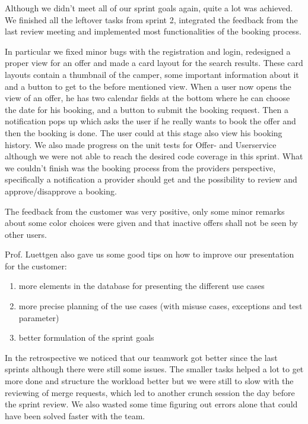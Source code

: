 Although we didn't meet all of our sprint goals again, quite a lot was achieved.
We finished all the leftover tasks from sprint 2, integrated the feedback from the last review meeting and implemented most functionalities of the booking process.

In particular we fixed minor bugs with the registration and login, redesigned a proper view for an offer and made a card layout for the search results.
These card layouts contain a thumbnail of the camper, some important information about it and a button to get to the before mentioned view.
When a user now opens the view of an offer, he has two calendar fields at the bottom where he can choose the date for his booking,
and a button to submit the booking request. Then a notification pops up which asks the user if he really wants to book the offer
and then the booking is done. The user could at this stage also view his booking history.
We also made progress on the unit tests for Offer- and Userservice although we were not able to reach the desired code coverage in this sprint.
What we couldn't finish was the booking process from the providers perspective, specifically a notification a provider should get and the possibility to review and approve/disapprove a booking.

The feedback from the customer was very positive, only some minor remarks about some color choices were given and that inactive offers shall not be seen by other users.

Prof. Luettgen also gave us some good tips on how to improve our presentation for the customer:
\begin{enumerate}
    \item more elements in the database for presenting the different use cases
    \item more precise planning of the use cases (with misuse cases, exceptions and test parameter)
    \item better formulation of the sprint goals
\end{enumerate}


In the retrospective we noticed that our teamwork got better since the last sprints although there were still some issues.
The smaller tasks helped a lot to get more done and structure the workload better but we were still to slow with the reviewing of merge requests, which led to another crunch session the day before the sprint review.
We also wasted some time figuring out errors alone that could have been solved faster with the team.
